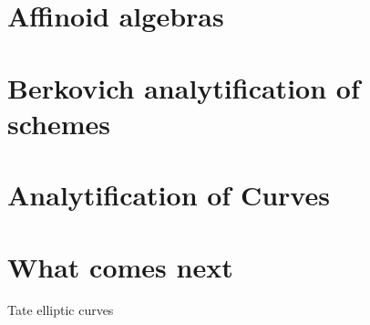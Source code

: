 \documentclass[a4paper]{article}
\begin{document}
\section{Affinoid algebras} \label{sec:affinoid_algebras}




\section{Berkovich analytification of schemes} \label{sec:berkovich_analytification_of_schemes}



\section{Analytification of Curves} \label{sec:analytification_of_curves}


\section{What comes next} \label{sec:what_comes_next}

Tate elliptic curves

\printbibliography
	
\end{document}
